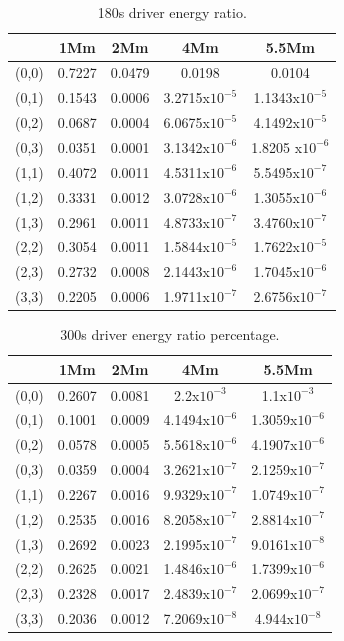 \documentclass[final,1p]{elsarticle}
\begin{document}
\begin{table}
\centering
\begin{tabular}{c c c c c }
\hline
   &  1Mm & 2Mm & 4Mm & 5.5Mm \\
\hline
(0,0) &  0.7227 & 0.0479 & 0.0198 & 0.0104 \\
\hline
(0,1) & 0.1543 & 0.0006 & 3.2715x$10^{-5}$ &  1.1343x$10^{-5}$\\
\hline
(0,2) & 0.0687 & 0.0004 & 6.0675x$10^{-5}$ &  4.1492x$10^{-5}$\\
\hline
(0,3) & 0.0351 & 0.0001 & 3.1342x$10^{-6}$ & 1.8205 x$10^{-6}$\\
\hline
(1,1) & 0.4072 & 0.0011 & 4.5311x$10^{-6}$ &  5.5495x$10^{-7}$\\
\hline
(1,2) & 0.3331 & 0.0012 & 3.0728x$10^{-6}$ &  1.3055x$10^{-6}$\\
\hline
(1,3) & 0.2961 & 0.0011 & 4.8733x$10^{-7}$ &  3.4760x$10^{-7}$\\
\hline
(2,2) & 0.3054 & 0.0011 & 1.5844x$10^{-5}$ &  1.7622x$10^{-5}$\\
\hline
(2,3) & 0.2732 & 0.0008 & 2.1443x$10^{-6}$ &  1.7045x$10^{-6}$\\
\hline
(3,3) & 0.2205 & 0.0006 & 1.9711x$10^{-7}$ &  2.6756x$10^{-7}$\\
\hline
\end{tabular} 
\caption{ 180s driver energy ratio. }
\end{table}





\begin{table}
\centering
\begin{tabular}{c c c c c }
\hline
   &  1Mm & 2Mm & 4Mm & 5.5Mm \\
\hline
(0,0) &  0.2607 & 0.0081 & 2.2x$10^{-3}$ &  1.1x$10^{-3}$\\
\hline
(0,1) & 0.1001 & 0.0009 & 4.1494x$10^{-6}$ &  1.3059x$10^{-6}$\\
\hline
(0,2) & 0.0578 & 0.0005 & 5.5618x$10^{-6}$ &  4.1907x$10^{-6}$\\
\hline
(0,3) & 0.0359 & 0.0004 &3.2621x$10^{-7}$ &  2.1259x$10^{-7}$\\
\hline
(1,1) & 0.2267 & 0.0016 & 9.9329x$10^{-7}$ &  1.0749x$10^{-7}$\\
\hline
(1,2) & 0.2535 & 0.0016 & 8.2058x$10^{-7}$ &  2.8814x$10^{-7}$\\
\hline
(1,3) & 0.2692 & 0.0023 & 2.1995x$10^{-7}$ &  9.0161x$10^{-8}$\\
\hline
(2,2) & 0.2625 & 0.0021 & 1.4846x$10^{-6}$ &  1.7399x$10^{-6}$\\
\hline
(2,3) & 0.2328 & 0.0017 & 2.4839x$10^{-7}$ &  2.0699x$10^{-7}$\\
\hline
(3,3) & 0.2036 & 0.0012 & 7.2069x$10^{-8}$ &  4.944x$10^{-8}$\\
\hline
\end{tabular} 
\caption{ 300s driver energy ratio percentage. }
\end{table}
\end{document}
